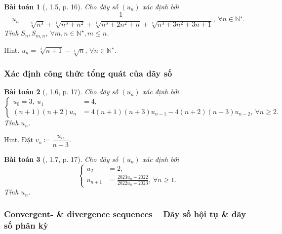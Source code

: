 \documentclass{article}
\newtheorem{baitoan}{Bài toán}
\begin{document}
\begin{baitoan}[\cite{Quoc_Long_Dat_Nam_VMC}, 1.5, p. 16]
	Cho dãy số $(u_n)$ xác định bởi
	\begin{equation*}
		u_n = \frac{1}{\sqrt[4]{n^3} + \sqrt[4]{n^3 + n^2} + \sqrt[4]{n^3 + 2n^2 + n} + \sqrt[4]{n^3 + 3n^2 + 3n + 1}},\ \forall n\in\mathbb{N}^\star.
	\end{equation*}
	Tính $S_n,S_{m,n}$, $\forall m,n\in\mathbb{N}^\star,m\le n$.
\end{baitoan}
{\sf Hint.} $u_n = \sqrt[4]{n + 1} - \sqrt[4]{n}$, $\forall n\in\mathbb{N}^\star$.


\subsubsection{Xác định công thức tổng quát của dãy số}

\begin{baitoan}[\cite{Quoc_Long_Dat_Nam_VMC}, 1.6, p. 17]
	Cho dãy số $(u_n)$ xác định bởi
	\begin{equation*}
		\left\{\begin{split}
			u_0 = 3,\ u_1 &= 4,\\
			(n + 1)(n + 2)u_n &= 4(n + 1)(n + 3)u_{n-1} - 4(n + 2)(n + 3)u_{n-2},\ \forall n\ge2.
		\end{split}\right.
	\end{equation*}
	Tính $u_n$.
\end{baitoan}
{\sf Hint.} Đặt $v_n\coloneqq\dfrac{u_n}{n + 3}$.

\begin{baitoan}[\cite{Quoc_Long_Dat_Nam_VMC}, 1.7, p. 17]
	Cho dãy số $(u_n)$ xác định bởi
	\begin{equation*}
		\left\{\begin{split}
			u_2 &= 2,\\
			u_{n+1} &= \frac{2023u_n + 2022}{2022u_n + 2023},\ \forall n\ge1.
		\end{split}\right.
	\end{equation*}
	Tính $u_n$.
\end{baitoan}


\subsubsection{Convergent- \& divergence sequences -- Dãy số hội tụ \& dãy số phân kỳ}
\end{document}
